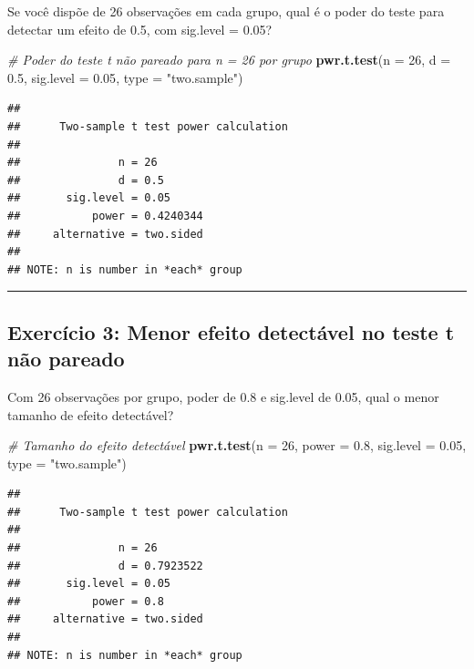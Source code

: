 \documentclass[
]{book}
\newenvironment{Shaded}{\begin{snugshade}}{\end{snugshade}}
\newcommand{\AttributeTok}[1]{\textcolor[rgb]{0.13,0.29,0.53}{#1}}
\newcommand{\CommentTok}[1]{\textcolor[rgb]{0.56,0.35,0.01}{\textit{#1}}}
\newcommand{\DecValTok}[1]{\textcolor[rgb]{0.00,0.00,0.81}{#1}}
\newcommand{\FloatTok}[1]{\textcolor[rgb]{0.00,0.00,0.81}{#1}}
\newcommand{\FunctionTok}[1]{\textcolor[rgb]{0.13,0.29,0.53}{\textbf{#1}}}
\newcommand{\NormalTok}[1]{#1}
\newcommand{\StringTok}[1]{\textcolor[rgb]{0.31,0.60,0.02}{#1}}
\begin{document}
Se você dispõe de 26 observações em cada grupo, qual é o poder do teste para detectar um efeito de 0.5, com sig.level = 0.05?

\begin{Shaded}
\begin{Highlighting}[]
\CommentTok{\# Poder do teste t não pareado para n = 26 por grupo}
\FunctionTok{pwr.t.test}\NormalTok{(}\AttributeTok{n =} \DecValTok{26}\NormalTok{, }\AttributeTok{d =} \FloatTok{0.5}\NormalTok{, }\AttributeTok{sig.level =} \FloatTok{0.05}\NormalTok{, }\AttributeTok{type =} \StringTok{"two.sample"}\NormalTok{)}
\end{Highlighting}
\end{Shaded}

\begin{verbatim}
## 
##      Two-sample t test power calculation 
## 
##               n = 26
##               d = 0.5
##       sig.level = 0.05
##           power = 0.4240344
##     alternative = two.sided
## 
## NOTE: n is number in *each* group
\end{verbatim}

\begin{center}\rule{0.5\linewidth}{0.5pt}\end{center}

\subsection{Exercício 3: Menor efeito detectável no teste t não pareado}\label{exercuxedcio-3-menor-efeito-detectuxe1vel-no-teste-t-nuxe3o-pareado}

Com 26 observações por grupo, poder de 0.8 e sig.level de 0.05, qual o menor tamanho de efeito detectável?

\begin{Shaded}
\begin{Highlighting}[]
\CommentTok{\# Tamanho do efeito detectável}
\FunctionTok{pwr.t.test}\NormalTok{(}\AttributeTok{n =} \DecValTok{26}\NormalTok{, }\AttributeTok{power =} \FloatTok{0.8}\NormalTok{, }\AttributeTok{sig.level =} \FloatTok{0.05}\NormalTok{, }\AttributeTok{type =} \StringTok{"two.sample"}\NormalTok{)}
\end{Highlighting}
\end{Shaded}

\begin{verbatim}
## 
##      Two-sample t test power calculation 
## 
##               n = 26
##               d = 0.7923522
##       sig.level = 0.05
##           power = 0.8
##     alternative = two.sided
## 
## NOTE: n is number in *each* group
\end{verbatim}
\end{document}
